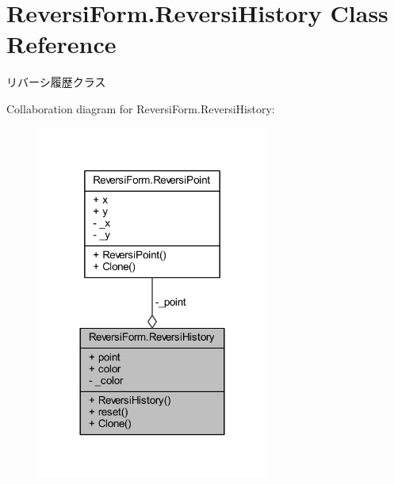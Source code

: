 \hypertarget{class_reversi_form_1_1_reversi_history}{}\section{Reversi\+Form.\+Reversi\+History Class Reference}
\label{class_reversi_form_1_1_reversi_history}


リバーシ履歴クラス  




Collaboration diagram for Reversi\+Form.\+Reversi\+History\+:\nopagebreak
\begin{figure}[H]
\begin{center}
\leavevmode
\includegraphics[width=216pt]{class_reversi_form_1_1_reversi_history__coll__graph}
\end{center}
\end{figure}
